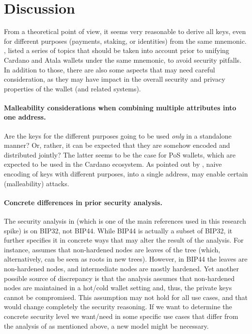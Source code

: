 \section{Discussion}
\label{sec:discussion}

From a theoretical point of view, it seems very reasonable to derive all
keys, even for different purposes (payments, staking, or identities) from
the same mnemonic. , listed a series of topics
that should be taken into account prior to unifying Cardano and Atala
wallets under the same mnemonic, to avoid security pitfalls. In addition to
those,  there are also some aspects that may need careful consideration, as they
may have impact in the overall security and privacy properties of the wallet
(and related systems).

\paragraph{Malleability considerations when combining multiple
  attributes into one address.} %
Are the keys for the different purposes going to be used \emph{only} in a
standalone manner? Or, rather, it can be expected that they are somehow
encoded and distributed jointly? The latter seems to be the case for PoS
wallets, which are expected to be used in the Cardano ecosystem. As pointed
out by \cite{kkl20}, naive encoding of keys with different purposes, into
a single address, may enable certain (malleability) attacks.

\paragraph{Concrete differences in prior security analysis.} %
The security analysis in \cite{def+21} (which is one of the main references
used in this research spike) is on BIP32, not BIP44. While BIP44
is actually a subset of BIP32, it further specifies it in concrete ways
that may alter the result of the analysis. For instance, \cite{def+21}
assumes that non-hardened nodes are leaves of the tree (which, alternatively,
can be seen as roots in new trees). However, in BIP44 the leaves are
non-hardened nodes, and intermediate nodes are mostly hardened. Yet another
possible source of discrepancy is that the analysis assumes that non-hardened
nodes are maintained in a hot/cold wallet setting and, thus, the private keys
cannot be compromised. This assumption may not hold for all use cases, and
that would change completely the security reasoning. If we want to determine
the concrete security level we want/need in some specific use cases that differ
from the analysis of \cite{def+21} as mentioned above, a new model might be
necessary.

